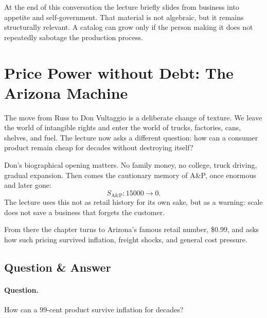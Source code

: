 At the end of this conversation the lecture briefly slides from business into appetite and self-government. That material is not algebraic, but it remains structurally relevant. A catalog can grow only if the person making it does not repeatedly sabotage the production process.

\section{Price Power without Debt: The Arizona Machine}

The move from Russ to Don Vultaggio is a deliberate change of texture. We leave the world of intangible rights and enter the world of trucks, factories, cans, shelves, and fuel. The lecture now asks a different question: how can a consumer product remain cheap for decades without destroying itself?

Don's biographical opening matters. No family money, no college, truck driving, gradual expansion. Then comes the cautionary memory of A\&P, once enormous and later gone:
\begin{equation}
S_{\mathrm{A\&P}}:15000\to 0.
\end{equation}
The lecture uses this not as retail history for its own sake, but as a warning: scale does not save a business that forgets the customer.

From there the chapter turns to Arizona's famous retail number, \$0.99, and asks how such pricing survived inflation, freight shocks, and general cost pressure.

\subsection{Question \& Answer}

\paragraph{Question.} How can a \(99\)-cent product survive inflation for decades?

